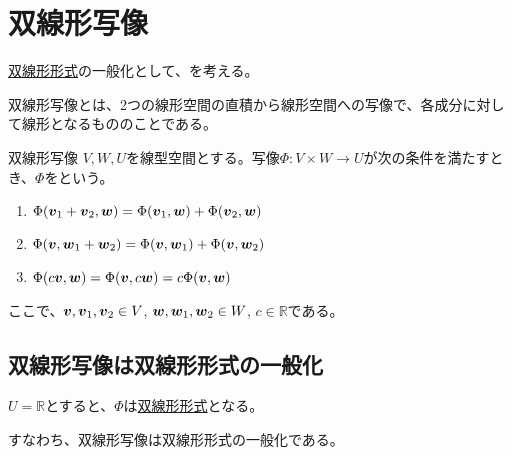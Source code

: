 \documentclass[../../../topic_linear-algebra]{subfiles}
\begin{document}
\sectionline
\section{双線形写像}

\hyperref[def:bilinear-form]{双線形形式}の一般化として、を考える。

\br

双線形写像とは、2つの線形空間の直積から線形空間への写像で、各成分に対して線形となるもののことである。

\begin{definition}{双線形写像}\label{def:bilinear-map}
  $V,W,U$を線型空間とする。写像$\Phi \colon V \times W \to U$が次の条件を満たすとき、$\Phi$をという。
  \begin{enumerate}[label=\romanlabel]
    \item $\Phi(\vb*{v}_1 + \vb*{v}_2, \vb*{w}) = \Phi(\vb*{v}_1, \vb*{w}) + \Phi(\vb*{v}_2, \vb*{w})$
    \item $\Phi(\vb*{v}, \vb*{w}_1 + \vb*{w}_2) = \Phi(\vb*{v}, \vb*{w}_1) + \Phi(\vb*{v}, \vb*{w}_2)$
    \item $\Phi(c\vb*{v}, \vb*{w}) = \Phi(\vb*{v}, c\vb*{w}) = c\Phi(\vb*{v}, \vb*{w})$
  \end{enumerate}
  ここで、$\vb*{v}, \vb*{v}_1, \vb*{v}_2 \in V$, $\vb*{w}, \vb*{w}_1, \vb*{w}_2 \in W$, $c \in \mathbb{R}$である。
\end{definition}

\subsection{双線形写像は双線形形式の一般化}

$U = \mathbb{R}$とすると、$\Phi$は\hyperref[def:bilinear-form]{双線形形式}となる。

すなわち、双線形写像は双線形形式の一般化である。
\end{document}
